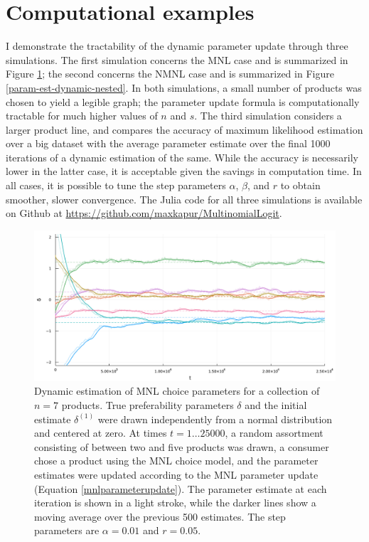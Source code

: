 \documentclass[preprint,12pt,authoryear]{elsarticle}
\begin{document}
\section{Computational examples}
I demonstrate the tractability of the dynamic parameter update through three simulations. The first simulation concerns the MNL case and is summarized in Figure \ref{param-est-dynamic-nonnested}; the second concerns the NMNL case and is summarized in Figure \ref{param-est-dynamic-nested}. In both simulations, a small number of products was chosen to yield a legible graph; the parameter update formula is computationally tractable for much higher values of $n$ and $s$. The third simulation considers a larger product line, and compares the accuracy of maximum likelihood estimation over a big dataset with the average parameter estimate over the final 1000 iterations of a dynamic estimation of the same. While the accuracy is necessarily lower in the latter case, it is acceptable given the savings in computation time. In all cases, it is possible to tune the step parameters $\alpha$, $\beta$, and $r$ to obtain smoother, slower convergence. The Julia code for all three simulations is available on Github at \url{https://github.com/maxkapur/MultinomialLogit}. 

\begin{figure}
\begin{center}\includegraphics[width=\textwidth]{../plots/param-est-dynamic-nonnested.pdf}\end{center}
\captionsetup{singlelinecheck=off}
    \caption[.]{Dynamic estimation of MNL choice parameters for a collection of $n = 7$ products. True preferability parameters $\delta$ and the initial estimate $\delta^{(1)}$ were drawn independently from a normal distribution and centered at zero. At times $t = 1 \dots 25000$, a random assortment consisting of between two and five products was drawn, a consumer chose a product using the MNL choice model, and the parameter estimates were updated according to the MNL parameter update (Equation \ref{mnlparameterupdate}). The parameter estimate at each iteration is shown in a light stroke, while the darker lines show a moving average over the previous 500 estimates. The step parameters are $\alpha = 0.01$ and $r = 0.05$.}
\label{param-est-dynamic-nonnested}
\end{figure}
\end{document}
